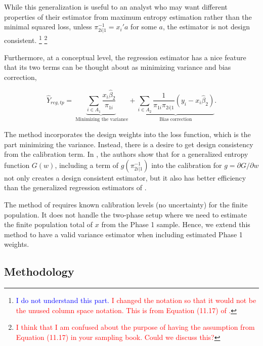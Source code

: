 \documentclass[12pt]{article}
\begin{document}
While this generalization is useful to an analyst who may want different
properties of their estimator from maximum entropy estimation rather than the
minimal squared loss, 
unless $\pi_{2i|1}^{-1} = x_i'a$ for some $a$, the
estimator is not design consistent. 
\footnote{ \textcolor{blue}{I do not understand this part.} 
  \textcolor{red}{I changed the
notation so that it would not be the unused column space notation. This is from
Equation (11.17) of \cite{kim2024statistics}.}} 
\footnote{\textcolor{red}{I think that I am confused about the purpose of having
the assumption from Equation (11.17) in your sampling book. Could we discuss
this?}}

Furthermore, at a conceptual level, the regression estimator
has a nice feature that its two terms can be thought about as minimizing
variance and bias correction,

$$ \hat Y_{reg, tp} 
= \underbrace{\sum_{i \in A_1} \frac{x_i \hat \beta_2}{\pi_{1i}}}_{
  \text{ Minimizing the variance}} + \underbrace{\sum_{i \in A_2}
\frac{1}{\pi_{1i}\pi_{2i|1}} (y_i - x_i \hat \beta_2)}_{
\text{Bias correction}}.$$

The \cite{deville1992calibration} method incorporates the design weights into
the loss function, which is the part minimizing the variance. Instead, there is
a desire to get design consistency from the calibration term. In 
\cite{kwon2024debiased}, the authors show that for a generalized entropy
function $G(w)$, including a term of $g(\pi_{2i|1}^{-1})$ into the calibration
for $g = \partial G / \partial w$ not only creates a design consistent
estimator, but it also has better efficiency than the generalized regression
estimators of \cite{deville1992calibration}.

The method of \cite{kwon2024debiased} requires known calibration
levels (no uncertainty) for the finite population. It does not handle the
two-phase setup where we need to estimate the finite population total of $x$
from the Phase 1 sample. Hence, we extend this method to have a valid variance 
estimator when including estimated Phase 1 weights.

\subsection*{Methodology}

\end{document}
